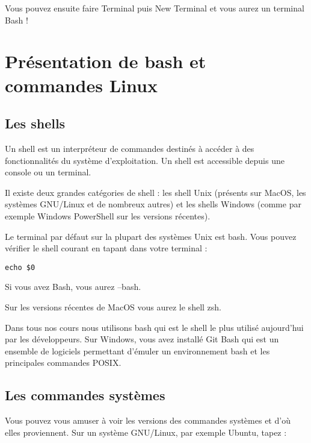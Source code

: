 \documentclass{article}
\begin{document}
Vous pouvez ensuite faire {\color{blue}Terminal} puis {\color{blue}New Terminal} et vous aurez un terminal {\color{blue}Bash} !

\section{Présentation de bash et commandes Linux}
\subsection{Les {\color{blue}shells}}
Un {\color{blue}shell} est un interpréteur de commandes destinés à accéder à des fonctionnalités du système d'exploitation. Un {\color{blue}shell} est accessible depuis une console ou un terminal.

Il existe deux grandes catégories de {\color{blue}shell} : les {\color{blue}shell Unix} (présents sur {\color{blue}MacOS}, les systèmes {\color{blue}GNU/Linux} et de nombreux autres) et les {\color{blue}shells Windows} (comme par exemple {\color{blue}Windows PowerShell} sur les versions récentes).

Le terminal par défaut sur la plupart des systèmes {\color{blue}Unix} est {\color{blue}bash}. Vous pouvez vérifier le {\color{blue}shell} courant en tapant dans votre terminal :

\begin{verbatim}
echo $0
\end{verbatim}

Si vous avez {\color{blue}Bash}, vous aurez {\color{blue}--bash}.

Sur les versions récentes de {\color{blue}MacOS} vous aurez le {\color{blue}shell zsh}.

Dans tous nos cours nous utilisons {\color{blue}bash} qui est le {\color{blue}shell} le plus utilisé aujourd'hui par les développeurs. Sur {\color{blue}Windows}, vous avez installé {\color{blue}Git Bash} qui est un ensemble de logiciels permettant d'émuler un environnement bash et les principales commandes {\color{blue}POSIX}.

\subsection{Les commandes systèmes}
Vous pouvez vous amuser à voir les versions des commandes systèmes et d'où elles proviennent. Sur un système {\color{blue}GNU/Linux}, par exemple {\color{blue}Ubuntu}, tapez :
\end{document}
